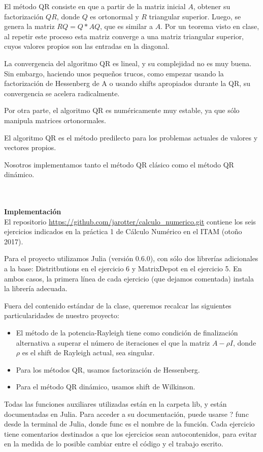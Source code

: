 \documentclass[11pt]{article}
\begin{document}
El método QR consiste en que a partir de la matriz inicial $A$, obtener su factorización $QR$, donde $Q$ es ortonormal y $R$ triangular superior. Luego, se genera la matriz $RQ=Q*AQ$, que es similar a $A$. Por un teorema visto en clase, al repetir este proceso esta matriz converge a una matriz triangular superior, cuyos valores propios son las entradas en la diagonal.



La convergencia del algoritmo QR es lineal, y su complejidad no es muy buena. Sin embargo, haciendo unos pequeños trucos, como empezar usando la factorización de Hessenberg de A o usando shifts apropiados durante la QR, su convergencia se acelera radicalmente.



Por otra parte, el algoritmo QR es numéricamente muy estable, ya que sólo manipula matrices ortonormales.



El algoritmo QR es el método predilecto para los problemas actuales de valores y vectores propios.



Nosotros implementamos tanto el método QR clásico como el método QR dinámico.


\\
\\
\noindent
\newpage
\textbf{\LARGE{Implementación}}
\\
El repositorio \url{https://github.com/jarotter/calculo_numerico.git} contiene los
 seis ejercicios indicados en la práctica 1 de Cálculo Numérico en el ITAM
 (otoño 2017).

Para el proyecto utilizamos Julia (versión 0.6.0), con sólo dos librerías adicionales a la base:
Distritbutions en el ejercicio 6 y MatrixDepot en el ejercicio 5. En ambos
casos, la primera línea de cada ejercicio (que dejamos comentada) instala la
librería adecuada.

Fuera del contenido estándar de la clase, queremos recalcar las siguientes
particularidades de nuestro proyecto:

\begin{itemize}
\item El método de la potencia-Rayleigh tiene como condición de finalización
alternativa a superar el número de iteraciones el que la matriz
$A-\rho I$, donde $\rho$ es el shift de Rayleigh actual, sea singular.

\item Para los métodos QR, usamos factorización de Hessenberg.

\item Para el método QR dinámico, usamos shift de Wilkinson.
\end{itemize}
Todas las funciones auxiliares utilizadas están en la carpeta lib, y están
documentadas en Julia. Para acceder a su documentación, puede usarse ? func
desde la terminal de Julia, donde func es el nombre de la función. Cada
ejercicio tiene comentarios destinados a que los ejercicios sean autocontenidos,
para evitar en la medida de lo posible cambiar entre el código y el
trabajo escrito.
\end{document}
